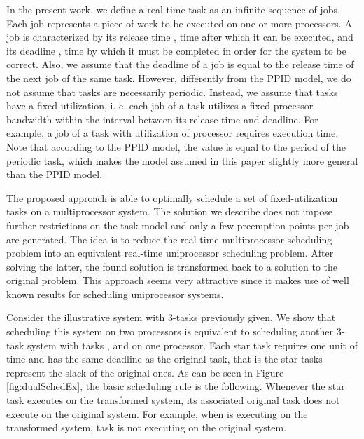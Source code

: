 \documentclass[twocolumn, compsocconf]{IEEEtran}
\newcounter{proc}
\begin{document}
In the present work, we define a real-time task as an infinite sequence of
jobs. Each job represents a piece of work to be executed on one or more
processors. A job is characterized by its release time , time after which it
can be executed, and its deadline , time by which it must be completed in
order for the system to be correct. Also, we assume that the deadline of a job
is equal to the release time of the next job of the same task. However,
differently from the PPID model, we do not assume that tasks are necessarily
periodic. Instead, we assume that tasks have a fixed-utilization, i. e. each job
of a task utilizes a fixed processor bandwidth within the interval between its
release time and deadline. For example, a job of a task with utilization  of processor requires  execution time. Note that according to the
PPID model, the value  is equal to the period of the periodic task, which
makes the model assumed in this paper slightly more general than the PPID model.

The proposed approach is able to optimally schedule a set of fixed-utilization
tasks on a multiprocessor system. The solution we describe does
not impose further restrictions on the task model and only a few preemption
points per job are generated. The idea is to reduce the real-time multiprocessor
scheduling problem into an equivalent real-time uniprocessor scheduling
problem. After solving the latter, the found solution is transformed back to a
solution to the original problem. This approach seems very attractive since it
makes use of well known results for scheduling uniprocessor systems.

Consider the illustrative system with 3-tasks previously given. We show that
scheduling this system on two processors is equivalent to scheduling another
3-task system with tasks ,  and  on one
processor. Each star task requires one unit of time and has the same deadline as
the original task, that is the star tasks represent the slack of the original
ones. As can be seen in Figure \ref{fig:dualSchedEx}, the basic scheduling rule
is the following. Whenever the star task executes on the transformed system, its
associated original task does not execute on the original system. For example,
when  is executing on the transformed system, task  is not
executing on the original system.
\end{document}
